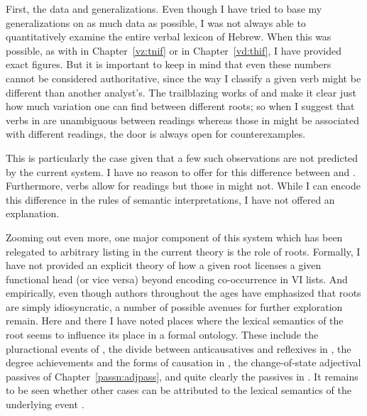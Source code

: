 \begin{exe}
\begin{xlist}
\begin{xlist}
\begin{xlist}
\begin{xlist}
\begin{xlist}
\begin{xlist}
\begin{exe}
\begin{xlist}
\begin{exe}
\begin{exe}
\begin{xlist}
\begin{exe}
\begin{exe}
\begin{xlist}
\begin{exe}
\begin{xlist}
\begin{exe}
\begin{xlist}
\begin{exe}
\begin{xlist}
\begin{exe}
\begin{xlist}
\begin{exe}
\begin{xlist}
\begin{exe}
\begin{xlist}
\begin{exe}
\begin{xlist}
\begin{exe}
\begin{xlist}
\begin{exe}
\begin{xlist}
\begin{exe}
\begin{xlist}
First, the data and generalizations. Even though I have tried to base my generalizations on as much data as possible, I was not always able to quantitatively examine the entire verbal lexicon of Hebrew. When this was possible, as with {\tnif} in Chapter~\ref{vz:tnif} or {\thif} in Chapter~\ref{vd:thif}, I have provided exact figures. But it is important to keep in mind that even these numbers cannot be considered authoritative, since the way I classify a given verb might be different than another analyst's. The trailblazing works of \cite{doron03} and \cite{arad05} make it clear just how much variation one can find between different roots; so when I suggest that verbs in {\thit} are unambiguous between readings whereas those in {\tnif} might be associated with different readings, the door is always open for counterexamples.

This is particularly the case given that a few such observations are not predicted by the current system. I have no reason to offer for this difference between {\thit} and {\tnif}. Furthermore, {\tnif} verbs allow for  readings but those in {\thit} might not. While I can encode this difference in the rules of semantic interpretations, I have not offered an explanation.

\label{r1:6:4}Zooming out even more, one major component of this system which has been relegated to arbitrary listing in the current theory is the role of roots. Formally, I have not provided an explicit theory of how a given root licenses a given functional head (or vice versa) beyond encoding co-occurrence in VI lists. And empirically, even though authors throughout the ages have emphasized that roots are simply idiosyncratic, a number of possible avenues for further exploration remain. Here and there I have noted places where the lexical semantics of the root seems to influence its place in a formal ontology. These include the pluractional events of {\tpie}, the divide between anticausatives and reflexives in {\thit}, the degree achievements and the forms of causation in {\thif}, the change-of-state adjectival passives of Chapter~\ref{passn:adjpass}, and quite clearly the passives in {\tnif}. It remains to be seen whether other cases can be attributed to the lexical semantics of the underlying event  \citep[114]{kastner16phd}.


\end{xlist}
\end{exe}
\end{xlist}
\end{exe}
\end{xlist}
\end{exe}
\end{xlist}
\end{exe}
\end{xlist}
\end{exe}
\end{xlist}
\end{exe}
\end{xlist}
\end{exe}
\end{xlist}
\end{exe}
\end{xlist}
\end{exe}
\end{xlist}
\end{exe}
\end{xlist}
\end{exe}
\end{exe}
\end{xlist}
\end{exe}
\end{exe}
\end{xlist}
\end{exe}
\end{xlist}
\end{xlist}
\end{xlist}
\end{xlist}
\end{xlist}
\end{xlist}
\end{exe}
